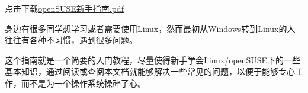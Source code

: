 点击下载\href{http://home.ustc.edu.cn/~zpj/pdf/openSUSE\%e6\%96\%b0\%e6\%89\%8b\%e6\%8c\%87\%e5\%8d\%97.pdf}{openSUSE新手指南.pdf}

身边有很多同学想学习或者需要使用Linux，然而最初从Windows转到Linux的人往往有各种不习惯，遇到很多问题。

这个指南就是一个简要的入门教程，尽量使得新手学会Linux/openSUSE下的一些基本知识，通过阅读或查阅本文档就能够解决一些常见的问题，以便于能够专心工作，而不是为一个操作系统操碎了心。
